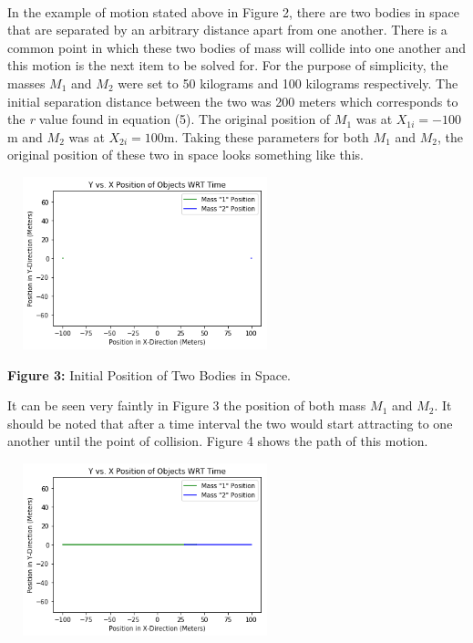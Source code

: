 \documentclass[]{article}
\begin{document}
\begin{multicols}{2}
\paragraph{}
\setlength{\parskip}{1em}
In the example of motion stated above in Figure 2, there are two bodies in space that are separated by an arbitrary distance apart from one another. There is a common point in which these two bodies of mass will collide into one another and this motion is the next item to be solved for. For the purpose of simplicity, the masses $M_1$ and $M_2$ were set to 50 kilograms and 100 kilograms respectively. The initial separation distance between the two was 200 meters which corresponds to the \textit{r} value found in equation (5). The original position of $M_1$ was at $X_{1i}=-100$m and $M_2$ was at $X_{2i}=100$m. Taking these parameters for both $M_1$ and $M_2$, the original position of these two in space looks something like this.
\begin{center}
\includegraphics[width=8cm, height=5.0cm]{PHYS 342 FP 2-Body (1).png}
\caption{\small{\textbf{Figure 3:}} \tiny{Initial Position of Two Bodies in Space.}}
\end{center}
It can be seen very faintly in Figure 3 the position of both mass $M_1$ and $M_2$. It should be noted that after a time interval the two would start attracting to one another until the point of collision. Figure 4 shows the path of this motion.
\begin{center}
\includegraphics[width=8cm, height=5.0cm]{PHYS 342 FP 2-Body (2).png}

\end{center}
\end{multicols}
\end{document}
